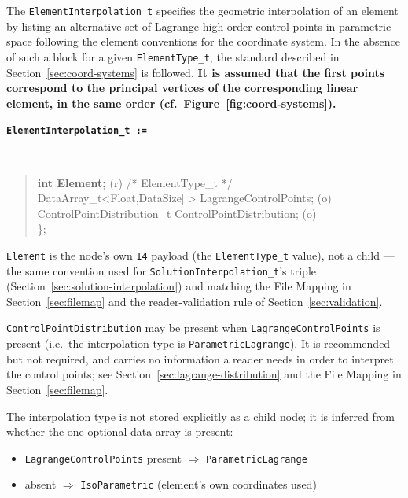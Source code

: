 \documentclass[11pt,letterpaper]{article}
\newenvironment{v2quote}
  {\begin{v2quoteframe}%
   \noindent{\footnotesize\sffamily\bfseries\color{cgnsblue}v2 text}%
   \nopagebreak\par\nopagebreak\vspace{0.15em}}
  {\end{v2quoteframe}}
\newenvironment{sidsnode}[1]{%
  \par\vspace{0.8em}%
  \noindent\colorbox{cgnslight!50}{\parbox{\dimexpr\linewidth-2\fboxsep}{%
    \raggedright\texttt{\textbf{\color{cgnsblue}#1}}}}\\[0.3em]%
  \begin{quote}\ttfamily
}{%
  \end{quote}\vspace{0.4em}%
}
\begin{document}
\begin{v2quote}
The \texttt{ElementInterpolation\_t} specifies the geometric interpolation of an element by
listing an alternative set of Lagrange high-order control points in parametric space following
the element conventions for the coordinate system.  In the absence of such a block for a given
\texttt{ElementType\_t}, the standard described in Section~\ref{sec:coord-systems} is followed.  \textbf{It is assumed that
the first points correspond to the principal vertices of the corresponding linear element, in the
same order (cf.\ Figure~\ref{fig:coord-systems}).}
\end{v2quote}

\begin{sidsnode}{ElementInterpolation\_t :=}
\textbf{int Element;}                                    \textrm{(r)} \quad\textrm{/* ElementType\_t */}\\
DataArray\_t<Float,DataSize[]> LagrangeControlPoints;    \textrm{(o)}\\
ControlPointDistribution\_t ControlPointDistribution; \textrm{(o)}\\
\};
\end{sidsnode}

\noindent \texttt{Element} is the node's own \texttt{I4} payload (the
\texttt{ElementType\_t} value), not a child --- the same convention used for
\texttt{SolutionInterpolation\_t}'s triple (Section~\ref{sec:solution-interpolation}) and
matching the File Mapping in Section~\ref{sec:filemap} and the reader-validation rule of
Section~\ref{sec:validation}.

\noindent \texttt{ControlPointDistribution} may be present when
\texttt{LagrangeControlPoints} is present (i.e.\ the interpolation type is
\texttt{ParametricLagrange}).  It is recommended but not required, and carries no
information a reader needs in order to interpret the control points; see
Section~\ref{sec:lagrange-distribution} and the File Mapping in
Section~\ref{sec:filemap}.

The interpolation type is not stored explicitly as a child node; it is inferred from
whether the one optional data array is present:
\begin{itemize}
  \item \texttt{LagrangeControlPoints} present $\Rightarrow$ \texttt{ParametricLagrange}
  \item absent $\Rightarrow$ \texttt{IsoParametric} (element's own coordinates used)
\end{itemize}
\end{document}
